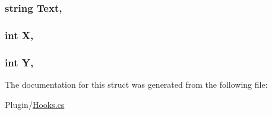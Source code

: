 \subsubsection[{Text}]{\setlength{\rightskip}{0pt plus 5cm}string Text\hspace{0.3cm}{\ttfamily [get]}, {\ttfamily [set]}}\label{structOTA_1_1Plugin_1_1HookArgs_1_1SignTextGet_ab4726c7c06ae41233e679361293b4173}
\hypertarget{structOTA_1_1Plugin_1_1HookArgs_1_1SignTextGet_a80c0944640e62d3ed6c5419c1bcc0c88}{}
\subsubsection[{X}]{\setlength{\rightskip}{0pt plus 5cm}int X\hspace{0.3cm}{\ttfamily [get]}, {\ttfamily [set]}}\label{structOTA_1_1Plugin_1_1HookArgs_1_1SignTextGet_a80c0944640e62d3ed6c5419c1bcc0c88}
\hypertarget{structOTA_1_1Plugin_1_1HookArgs_1_1SignTextGet_aa482c4cc86a24474e4fb19b5b5978778}{}
\subsubsection[{Y}]{\setlength{\rightskip}{0pt plus 5cm}int Y\hspace{0.3cm}{\ttfamily [get]}, {\ttfamily [set]}}\label{structOTA_1_1Plugin_1_1HookArgs_1_1SignTextGet_aa482c4cc86a24474e4fb19b5b5978778}


The documentation for this struct was generated from the following file\+:\begin{DoxyCompactItemize}
\item 
Plugin/\hyperlink{Hooks_8cs}{Hooks.\+cs}\end{DoxyCompactItemize}
